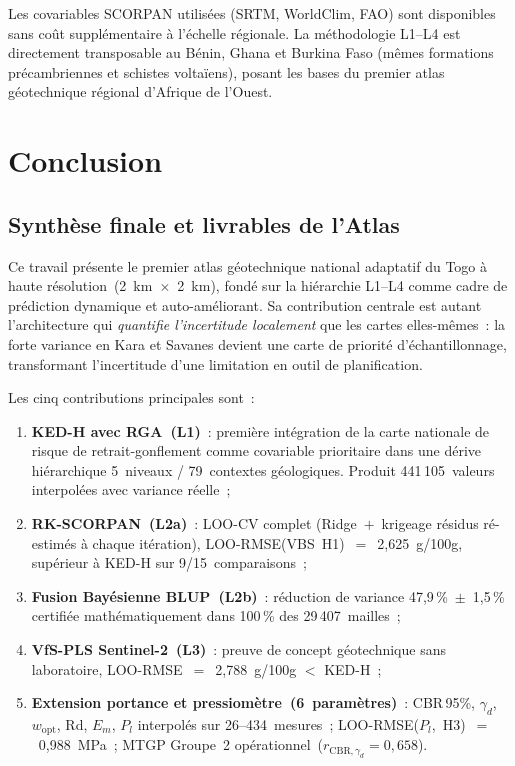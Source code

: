 \documentclass[10pt,a4paper,twocolumn]{article}
\begin{document}
	Les covariables SCORPAN utilisées (SRTM, WorldClim, FAO) sont
	disponibles sans coût supplémentaire à l'échelle régionale.
	La méthodologie L1--L4 est directement transposable au Bénin,
	Ghana et Burkina Faso (mêmes formations précambriennes et
	schistes voltaïens), posant les bases du premier atlas
	géotechnique régional d'Afrique de l'Ouest.
	
	\section{Conclusion}
	\label{sec:conclusion}
	
	\subsection{Synthèse finale et livrables de l'Atlas}
	
	Ce travail présente le premier atlas géotechnique national adaptatif
	du Togo à haute résolution~(2~km~$\times$~2~km), fondé sur la
	hiérarchie L1--L4 comme cadre de prédiction dynamique et
	auto-améliorant. Sa contribution centrale est autant l'architecture
	qui \emph{quantifie l'incertitude localement} que les cartes elles-mêmes~:
	la forte variance en Kara et Savanes devient une carte de priorité
	d'échantillonnage, transformant l'incertitude d'une limitation en outil
	de planification.
	
	Les cinq contributions principales sont~:
	\begin{enumerate}[noitemsep]
		\item \textbf{KED-H avec RGA~(L1)}~: première intégration
		de la carte nationale de risque de retrait-gonflement comme
		covariable prioritaire dans une dérive hiérarchique 5~niveaux /
		79~contextes géologiques. Produit 441\,105~valeurs interpolées
		avec variance réelle~;
		
		\item \textbf{RK-SCORPAN~(L2a)}~: LOO-CV complet
		(Ridge~$+$~krigeage résidus ré-estimés à chaque itération),
		LOO-RMSE(VBS~H1)~$=$~2{,}625~g/100g, supérieur à KED-H
		sur 9/15~comparaisons~;
		
		\item \textbf{Fusion Bayésienne BLUP~(L2b)}~: réduction de variance
		47{,}9\,\%~$\pm$~1{,}5\,\% certifiée mathématiquement dans
		100\,\% des 29\,407~mailles~;
		
		\item \textbf{VfS-PLS Sentinel-2~(L3)}~: preuve de concept
		géotechnique sans laboratoire,
		LOO-RMSE~$=$~2{,}788~g/100g $<$ KED-H~;
		
		\item \textbf{Extension portance et pressiomètre~(6~paramètres)}~:
		CBR\,95\%, $\gamma_d$, $w_{\mathrm{opt}}$, Rd, $E_m$, $P_l$
		interpolés sur 26--434~mesures~;
		LOO-RMSE($P_l$,~H3)~$=$~0{,}988~MPa~;
		MTGP Groupe~2 opérationnel~($r_{\mathrm{CBR},\gamma_d}=0{,}658$).
	\end{enumerate}
	
\end{document}
